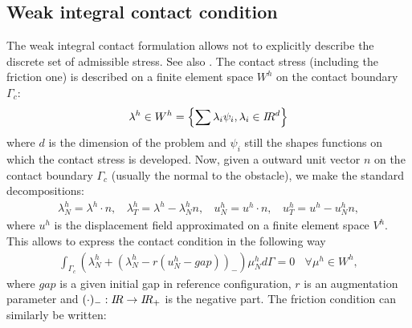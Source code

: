 \documentclass[a4paper,11pt,english]{sphinxmanual}
\begin{document}
\subsection{Weak integral contact condition}
\label{\detokenize{userdoc/model_contact_friction:weak-integral-contact-condition}}\label{\detokenize{userdoc/model_contact_friction:weak-integral-contact-section}}
The weak integral contact formulation allows not to explicitly describe the discrete set of admissible stress. See also {\hyperref[\detokenize{userdoc/model_Nitsche:nitsche-contact-small-def-section}]{}}. The contact stress (including the friction one) is described on a finite element space \(W^h\) on the contact boundary \(\Gamma_c\):
\begin{equation*}
\begin{split}\lambda^h \in W^h = \left\{ \sum \lambda_i \psi_i, \lambda_i \in I\hspace{-0.2em}R^d \right\}\end{split}
\end{equation*}
where \(d\) is the dimension of the problem and \(\psi_i\) still the shapes functions on which the contact stress is developed. Now, given a outward unit vector \(n\) on the contact boundary \(\Gamma_c\) (usually the normal to the obstacle), we make the standard decompositions:
\begin{equation*}
\begin{split}\lambda_N^h = \lambda^h \cdot n, ~~~~ \lambda_T^h = \lambda^h - \lambda_N^h n, ~~~~
u_N^h = u^h \cdot n, ~~~~ u_T^h = u^h - u_N^h n,\end{split}
\end{equation*}
where \(u^h\) is the displacement field approximated on a finite element space \(V^h\). This allows to express the contact condition in the following way
\begin{equation*}
\begin{split}\displaystyle \int_{\Gamma_c} (\lambda^h_N + (\lambda^h_N - r(u^h_N-gap))_-)\mu^h_N d\Gamma = 0 ~~~~ \forall \mu^h \in W^h,\end{split}
\end{equation*}
where \(gap\) is a given initial gap in reference configuration, \(r\) is an augmentation parameter and \((\cdot)_-:I\hspace{-0.2em}R\rightarrow I\hspace{-0.2em}R_+\) is the negative part. The friction condition can similarly be written:
\end{document}
